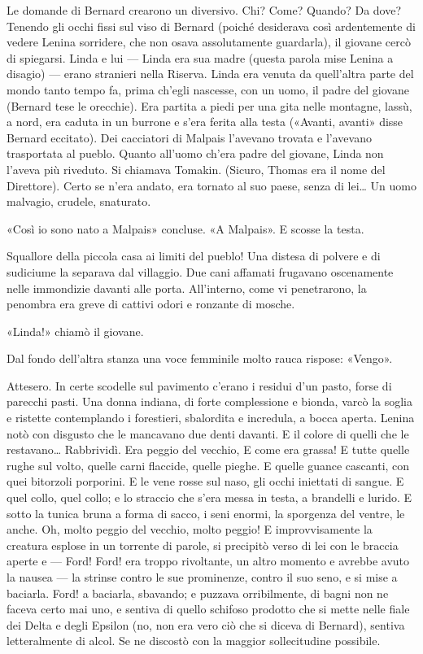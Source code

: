 \documentclass[
a5paper, %
10pt, %
twoside, 
onecolumn, %
openany, %
]{memoir}
\begin{document}
Le domande di Bernard crearono un diversivo. Chi? Come? Quando? Da dove? Tenendo gli occhi fissi sul viso di Bernard (poiché desiderava così ardentemente di vedere Lenina sorridere, che non osava assolutamente guardarla), il giovane cercò di spiegarsi. Linda e lui — Linda era sua madre (questa parola mise Lenina a disagio) — erano stranieri nella Riserva. Linda era venuta da quell’altra parte del mondo tanto tempo fa, prima ch’egli nascesse, con un uomo, il padre del giovane (Bernard tese le orecchie). Era partita a piedi per una gita nelle montagne, lassù, a nord, era caduta in un burrone e s’era ferita alla testa («Avanti, avanti» disse Bernard eccitato). Dei cacciatori di Malpais l’avevano trovata e l’avevano trasportata al pueblo. Quanto all’uomo ch’era padre del giovane, Linda non l’aveva più riveduto. Si chiamava Tomakin. (Sicuro, Thomas era il nome del Direttore). Certo se n’era andato, era tornato al suo paese, senza di lei… Un uomo malvagio, crudele, snaturato.

«Così io sono nato a Malpais» concluse. «A Malpais». E scosse la testa.

Squallore della piccola casa ai limiti del pueblo! Una distesa di polvere e di sudiciume la separava dal villaggio. Due cani affamati frugavano oscenamente nelle immondizie davanti alle porta. All’interno, come vi penetrarono, la penombra era greve di cattivi odori e ronzante di mosche.

«Linda!» chiamò il giovane.

Dal fondo dell’altra stanza una voce femminile molto rauca rispose: «Vengo».

Attesero. In certe scodelle sul pavimento c’erano i residui d’un pasto, forse di parecchi pasti. Una donna indiana, di forte complessione e bionda, varcò la soglia e ristette contemplando i forestieri, sbalordita e incredula, a bocca aperta. Lenina notò con disgusto che le mancavano due denti davanti. E il colore di quelli che le restavano… Rabbrividì. Era peggio del vecchio, E come era grassa! E tutte quelle rughe sul volto, quelle carni flaccide, quelle pieghe. E quelle guance cascanti, con quei bitorzoli porporini. E le vene rosse sul naso, gli occhi iniettati di sangue. E quel collo, quel collo; e lo straccio che s’era messa in testa, a brandelli e lurido. E sotto la tunica bruna a forma di sacco, i seni enormi, la sporgenza del ventre, le anche. Oh, molto peggio del vecchio, molto peggio! E improvvisamente la creatura esplose in un torrente di parole, si precipitò verso di lei con le braccia aperte e — Ford! Ford! era troppo rivoltante, un altro momento e avrebbe avuto la nausea — la strinse contro le sue prominenze, contro il suo seno, e si mise a baciarla. Ford! a baciarla, sbavando; e puzzava orribilmente, di bagni non ne faceva certo mai uno, e sentiva di quello schifoso prodotto che si mette nelle fiale dei Delta e degli Epsilon (no, non era vero ciò che si diceva di Bernard), sentiva letteralmente di alcol. Se ne discostò con la maggior sollecitudine possibile.
\end{document}
